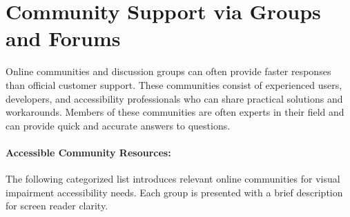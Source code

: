\section{Community Support via Groups and Forums}
\label{app1:community}
Online communities and discussion groups can often provide faster responses than official customer support. These communities consist of experienced users, developers, and accessibility professionals who can share practical solutions and workarounds. Members of these communities are often experts in their field and can provide quick and accurate answers to questions.

\paragraph{Accessible Community Resources:}
The following categorized list introduces relevant online communities for visual impairment accessibility needs. Each group is presented with a brief description for screen reader clarity.

